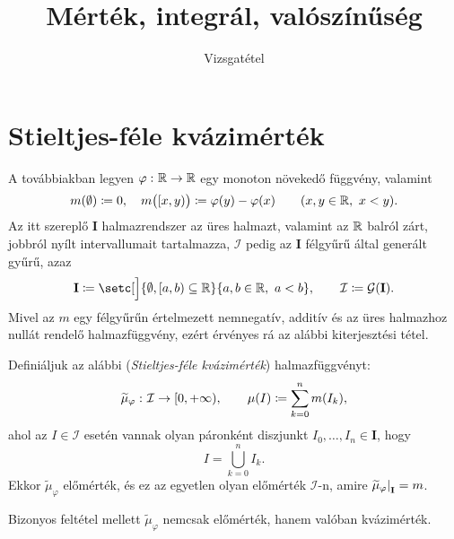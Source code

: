 \documentclass[
]{elteikthesis}[2024/04/26]
\title{Mérték, integrál, valószínűség} %
\subtitle{\circled{7} Vizsgatétel}
\begin{document}
	
	
	\section{Stieltjes-féle kvázimérték}
	
	A továbbiakban legyen \( \varphi \,\colon \mathbb{R} \to \mathbb{R} \) egy monoton növekedő függvény, 
	\marginnote{
		Tehát az itt szereplő halmazfüggvény
		\[
			\func{m}{\mathbf{I}}{[0, +\infty)}
		\]
	}
	valamint
	\[
		m(\emptyset) \coloneq 0, \quad
		m \bigl( [x, y) \bigr) \coloneq \varphi(y) - \varphi(x)
		\qquad (x, y \in \mathbb{R}, \ x < y).
	\]
	Az itt szereplő \( \mathbf{I} \) halmazrendszer az üres halmazt, 
	valamint az \( \mathbb{R} \) balról zárt, jobbról nyílt intervallumait tartalmazza, 
	\( \mathcal{I} \) pedig az \( \mathbf{I} \) félgyűrű által generált gyűrű, azaz
	\[
		\mathbf{I} \coloneq 
		\setc[\Big]{ \emptyset, [a, b) \subseteq \R }{ a, b \in \R, \ a < b }, \qquad
		\mathcal{I} \coloneq \mathcal{G}(\mathbf{I}).
	\]
	Mivel az \( m \) egy félgyűrűn értelmezett nemnegatív, 
	additív és az üres halmazhoz nullát rendelő halmazfüggvény, 
	ezért érvényes rá az alábbi kiterjesztési tétel.
	
	\begin{theorem}{}{}
		Definiáljuk az alábbi (\emph{Stieltjes-féle kvázimérték}) halmazfüggvényt:
		\[
			\widetilde{\mu}_\varphi \,\colon \mathcal{I} \to [0, +\infty), \qquad
			\mu(I) \coloneq \sum_{k=0}^{n} m( I_k ),
		\]
		ahol az \( I \in \mathcal{I} \) esetén vannak olyan
		páronként diszjunkt \( I_0, \dots, I_n \in \mathbf{I} \), hogy
		\[
			I = \bigcup_{k=0}^{n} I_k.
		\]
		Ekkor \( \widetilde{\mu}_\varphi \) előmérték,
		és ez az egyetlen olyan előmérték \( \mathcal{I} \)-n,
		amire \( \restr{ \widetilde{\mu}_\varphi }{ \mathbf{I} } = m \).
	\end{theorem}
	
	Bizonyos feltétel mellett \( \widetilde{\mu}_\varphi \) nemcsak előmérték, hanem valóban kvázimérték.
	
\end{document}
